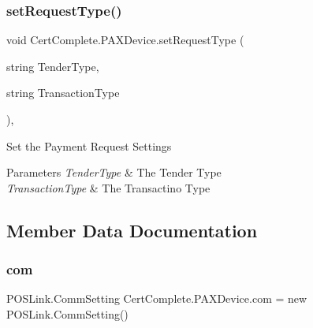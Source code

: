 \subsubsection{\texorpdfstring{set\+Request\+Type()}{setRequestType()}}
{\footnotesize\ttfamily void Cert\+Complete.\+P\+A\+X\+Device.\+set\+Request\+Type (\begin{DoxyParamCaption}\item[{string}]{Tender\+Type,  }\item[{string}]{Transaction\+Type }\end{DoxyParamCaption})\hspace{0.3cm}{\ttfamily [inline]}, {\ttfamily [private]}}






\begin{DoxyEnumerate}
\item Set the Payment Request Settings 
\end{DoxyEnumerate}


\begin{DoxyParams}{Parameters}
{\em Tender\+Type} & The Tender Type\\
\hline
{\em Transaction\+Type} & The Transactino Type\\
\hline
\end{DoxyParams}


\subsection{Member Data Documentation}
\mbox{\label{class_cert_complete_1_1_p_a_x_device_ae0fd2ac9f3d111a94efdf3415dcd63c7}} 
\subsubsection{\texorpdfstring{com}{com}}
{\footnotesize\ttfamily P\+O\+S\+Link.\+Comm\+Setting Cert\+Complete.\+P\+A\+X\+Device.\+com = new P\+O\+S\+Link.\+Comm\+Setting()\hspace{0.3cm}{\ttfamily [private]}}

\mbox{\label{class_cert_complete_1_1_p_a_x_device_a4100c53ceec220b6148ce00412775bcc}} 
